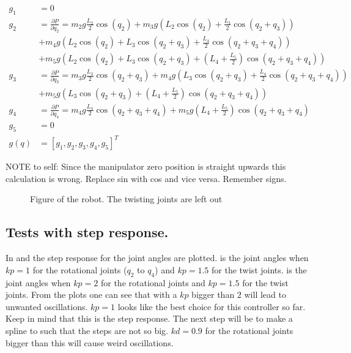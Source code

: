      \begin{align*}
        g_1 &= 0
        \\
        g_2 &= \frac{\partial P}{\partial q_2} = 
        m_2g\frac{L_2}{2}\cos{(q_2)}+
        m_3g\left( L_2 \cos{(q_2)} + \frac{L_3}{2}\cos{(q_2+q_3)} \right)\\&+
        m_4g\left( L_2 \cos{(q_2)} + L_3\cos{(q_2 + q_3)} + \frac{L_4}{2}\cos{(q_2+q_3+q_4)} \right)\\&+
        m_5g\left( L_2 \cos{(q_2)} + L_3\cos{(q_2 + q_3)} + \left(L_4 + \frac{L_5}{2} \right)\cos{(q_2+q_3+q_4)} \right)
        \\
        g_3 &= \frac{\partial P}{\partial q_3} =
        m_3g\frac{L_3}{2}\cos{(q_2+q_3)} +
        m_4g\left( L_3\cos{(q_2 + q_3)} + \frac{L_4}{2}\cos{(q_2+q_3+q_4)} \right)\\&+
        m_5g\left(  L_3\cos{(q_2 + q_3)} + \left(L_4 + \frac{L_5}{2} \right)\cos{(q_2+q_3+q_4)} \right)
        \\
        g_4 &=\frac{\partial P}{\partial q_4} = 
        m_4g\frac{L_4}{2}\cos{(q_2+q_3+q_4)}+
        m_5g\left(L_4 + \frac{L_5}{2} \right)\cos{(q_2+q_3+q_4)}
        \\
        g_5 &= 0
        \\
        g(q) &= [g_1,g_2,g_3,g_4,g_5]^T
     \end{align*}

NOTE to self: Since the manipulator zero position is straight upwards this calculation is wrong. Replace sin with cos and vice versa. Remember signs. 

\begin{figure}[htbp]
    \centering
    
    \caption{Figure of the robot. The twisting joints are left out}
    \label{draw:pot-rob}
\end{figure}


\subsection*{Tests with step response.}
In  and  the step response for the joint angles are plotted.  is the joint angles when $kp = 1$ for the rotational joints ($q_2$ to $q_4$) and $kp = 1.5$ for the twist joints.   is the joint angles when $kp = 2$ for the rotational joints and $kp = 1.5$ for the twist joints. From the plots one can see that with a $kp$ bigger than $2$ will lead to unwanted oscillations. $kp = 1$ looks like the best choice for this controller so far. Keep in mind that this is the step response. The next step will be to make a spline to such that the steps are not so big. $kd = 0.9$ for the rotational joints bigger than this will cause weird oscillations.

